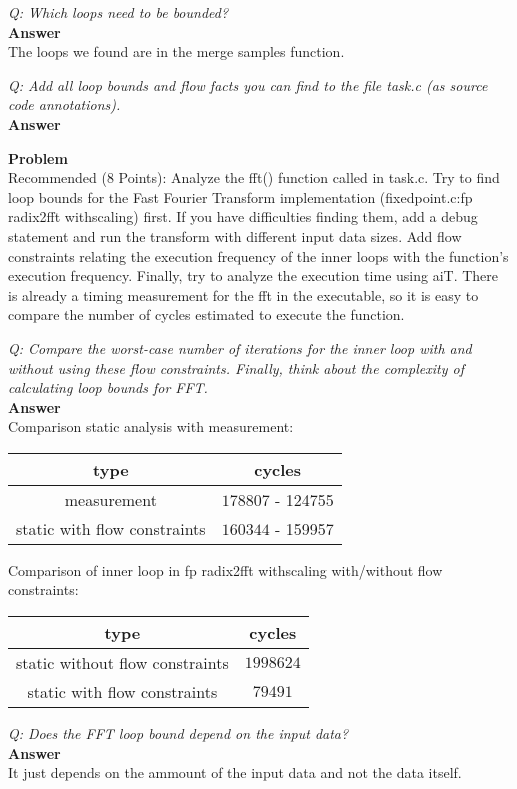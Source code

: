 \documentclass[a4paper,english,12pt,oneside]{article}
\newcounter{problemcounter}
\newcommand{\Prob}[1]{
\stepcounter{problemcounter}
\noindent\textbf{Problem \arabic{problemcounter}}\\
#1}
\newcommand{\Quest}[2]{
\noindent\emph{Q: #1}\\[0.7cm]
\noindent\textbf{Answer}\\
\noindent #2
}
\begin{document}
\Quest{Which loops need to be bounded?}
{
The loops we found are in the merge samples function.
}

\Quest{Add all loop bounds and flow facts you can find to the file task.c (as source code annotations).}
{

}




\Prob{Recommended (8 Points): Analyze the fft() function called in task.c. Try to find loop bounds for the Fast Fourier Transform implementation (fixedpoint.c:fp radix2fft withscaling) first. If you have difficulties finding them, add a debug statement and run the transform with different input data sizes. Add flow constraints relating the execution frequency of the inner loops with the function’s execution frequency. Finally, try to analyze the execution time using aiT. There is already a timing measurement for the fft in the executable, so it is easy to compare the number of cycles estimated to execute the function.}

\Quest{Compare the worst-case number of iterations for the inner loop with and without using these flow constraints. Finally, think about the complexity of calculating loop bounds for FFT.}
{
Comparison static analysis with measurement:

\begin{tabular}{|c|c|}
\hline
 type & cycles \\ \hline
 measurement & $178807$ - 124755 \\ \hline
 static with flow constraints & $160344$ - 159957\\ \hline
\end{tabular}

Comparison of inner loop in fp radix2fft withscaling with/without flow constraints:
\begin{tabular}{|c|c|}
    \hline
 type & cycles \\ \hline
 static without flow constraints & $1998624$ \\ \hline
 static with flow constraints & $79491$\\ \hline
\end{tabular}

}

\Quest{Does the FFT loop bound depend on the input data?}
{
It just depends on the ammount of the input data and not the data itself.
}
\end{document}
